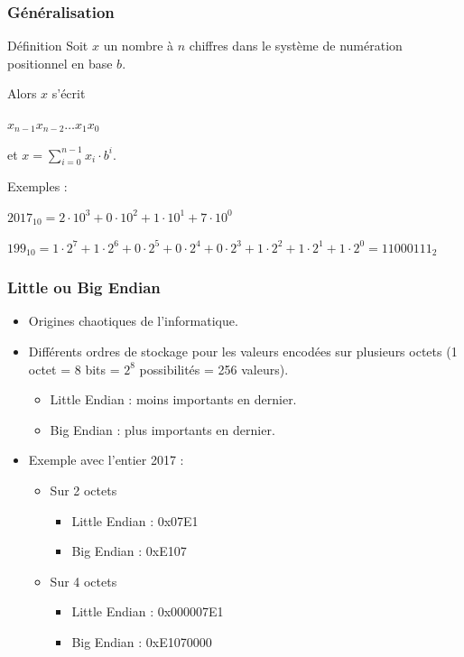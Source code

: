 	\frame
	{
		\frametitle{G\'en\'eralisation}
		\begin{block}{D\'efinition}
			Soit $x$ un nombre \`a $n$ chiffres dans le syst\`eme de num\'eration positionnel en base $b$.
			
			Alors $x$ s'\'ecrit
			
			$x_{n-1}x_{n-2}\ldots x_1x_0$
			
			et $x=\sum\limits_{i = 0}^{n-1}x_i\cdot b^i$.
		\end{block}
		
		Exemples :
		\begin{description}
			\item $2017_{10} = 2\cdot10^3 + 0\cdot10^2 + 1\cdot10^1+7\cdot10^0$
			\item $199_{10} = 1\cdot2^7 + 1\cdot2^6 + 0\cdot2^5+0\cdot2^4 + 0\cdot2^3 + 1\cdot2^2 + 1\cdot2^1+1\cdot2^0 = 11000111_2$
		\end{description}
	}

\frame
{
	\frametitle{Little ou Big Endian}
	\begin{itemize}
		\item Origines chaotiques de l'informatique.
		\item Diff\'erents ordres de stockage pour les valeurs encod\'ees sur plusieurs octets (1 octet = 8 bits = $2^8$ possibilit\'es = 256 valeurs).
		\begin{itemize}
			\item Little Endian : moins importants en dernier.
			\item Big Endian : plus importants en dernier.
		\end{itemize}
		\item Exemple avec l'entier 2017 :
		\begin{itemize}
			\item Sur 2 octets
			\begin{itemize}
				\item Little Endian : 0x07E1
				\item Big Endian : 0xE107
			\end{itemize}
			\item Sur 4 octets
			\begin{itemize}
				\item Little Endian : 0x000007E1
				\item Big Endian : 0xE1070000
			\end{itemize}
		\end{itemize}
	\end{itemize}
}

